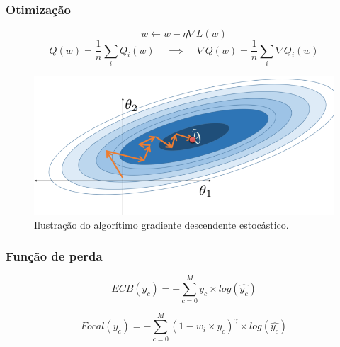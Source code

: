 \documentclass{beamer}
\begin{document}
\begin{frame}
    \frametitle{Otimização}

\begin{equation}
    w \leftarrow w - \eta \nabla L(w)
\end{equation}
\begin{equation}
Q(w) = \frac{1}{n}\sum_i Q_i(w)\;\;\;\;\implies\;\;\;\; \nabla Q(w) = \frac{1}{n}\sum_i \nabla Q_i(w)
\end{equation}
\begin{figure}[!ht]
    \centering
        \includegraphics[width=0.6\columnwidth]{Imagens/stochastic_gradient_descent.PNG}
    \caption{Ilustração do algorítimo gradiente descendente estocástico. }
    \label{fig:SGD}
\end{figure}
\end{frame}

\begin{frame}
    \frametitle{Função de perda}

    \begin{equation}
        ECB(y_c) = -\sum_{c=0}^{M} y_c \times log(\hat{y_c})
    \end{equation}

    \begin{equation}
        Focal(y_c) = -\sum_{c=0}^{M} (1-w_i \times y_c)^\gamma \times log(\hat{y_c})
    \end{equation}

\end{frame}
\end{document}
